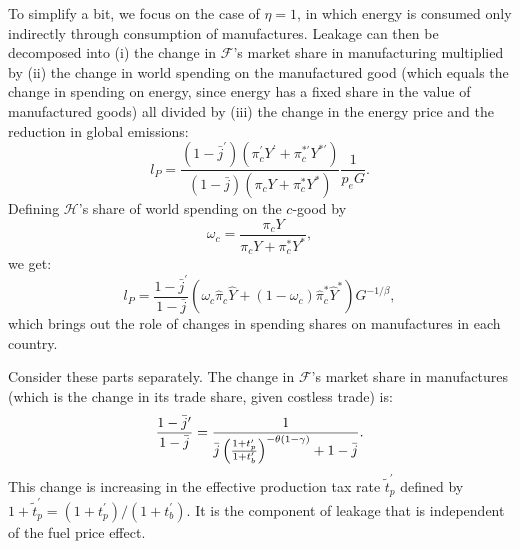 \documentclass[notitlepage,12pt]{article}
\begin{document}
To simplify a bit, we focus on the case of $\eta =1$, in which energy is
consumed only indirectly through consumption of manufactures. Leakage can
then be decomposed into (i) the change in $\mathcal{F}$'s market share in
manufacturing multiplied by (ii) the change in world spending on the
manufactured good (which equals the change in spending on energy, since
energy has a fixed share in the value of manufactured goods) all divided by
(iii) the change in the energy price and the reduction in global emissions:%
\begin{equation*}
l_{P}=\frac{\left( 1-\bar{j}^{\prime }\right) \left( \pi _{c}^{\prime
}Y^{\prime }+\pi _{c}^{\ast \prime }Y^{\ast \prime }\right) }{\left( 1-\bar{j%
}\right) \left( \pi _{c}Y+\pi _{c}^{\ast }Y^{\ast }\right) }\frac{1}{\hat{p}%
_{e}G}.
\end{equation*}%
Defining $\mathcal{H}$'s share of world spending on the $c$-good by%
\begin{equation*}
\omega _{c}=\frac{\pi _{c}Y}{\pi _{c}Y+\pi _{c}^{\ast }Y^{\ast }},
\end{equation*}%
we get:%
\begin{equation*}
l_{P}=\frac{1-\bar{j}^{\prime }}{1-\bar{j}}\left( \omega _{c}\hat{\pi}_{c}%
\hat{Y}+\left( 1-\omega _{c}\right) \hat{\pi}_{c}^{\ast }\hat{Y}^{\ast
}\right) G^{-1/\beta },
\end{equation*}%
which brings out the role of changes in spending shares on manufactures in
each country.

Consider these parts separately. The change in $\mathcal{F}$'s market share
in manufactures (which is the change in its trade share, given costless
trade) is:%
\begin{equation*}
\frac{1-\bar{j}^{\prime }}{1-\bar{j}}=\frac{1}{\bar{j}\left( \frac{%
1+t_{p}^{\prime }}{1+t_{b}^{\prime }}\right) ^{-\theta \left( 1-\gamma
\right) }+1-\bar{j}}.
\end{equation*}%
This change is increasing in the effective production tax rate $\tilde{t}%
_{p}^{\prime }$ defined by $1+\tilde{t}_{p}^{\prime }=(1+t_{p}^{\prime
})/(1+t_{b}^{\prime })$. It is the component of leakage that is independent
of the fuel price effect.
\end{document}
